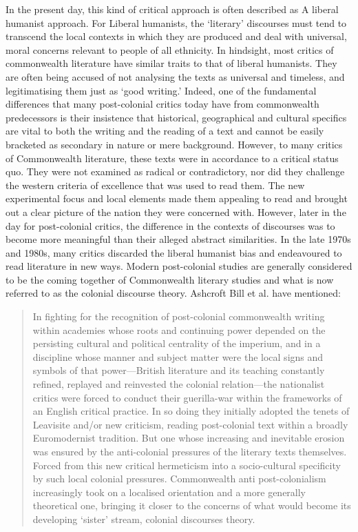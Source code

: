 In the present day, this kind of critical approach is often described as A liberal humanist approach. For Liberal humanists, the ‘literary’ discourses must tend to transcend the local contexts in which they are produced and deal with universal, moral concerns relevant to people of all ethnicity. In hindsight, most critics of commonwealth literature have similar traits to that of liberal humanists. They are often being accused of not analysing the texts as universal and timeless, and legitimatising them just as ‘good writing.’ Indeed, one of the fundamental differences that many post-colonial critics today have from commonwealth predecessors is their insistence that historical, geographical and cultural specifics are vital to both the writing and the reading of a text and cannot be easily bracketed as secondary in nature or mere background. However, to many critics of Commonwealth literature, these texts were in accordance to a critical status quo. They were not examined as radical or contradictory, nor did they challenge the western criteria of excellence that was used to read them. The new experimental focus and local elements made them appealing to read and brought out a clear picture of the nation they were concerned with. However, later in the day for post-colonial critics, the difference in the contexts of discourses was to become more meaningful than their alleged abstract similarities. In the late 1970s and 1980s, many critics discarded the liberal humanist bias and endeavoured to read literature in new ways. Modern post-colonial studies are generally considered to be the coming together of Commonwealth literary studies and what is now referred to as the colonial discourse theory. Ashcroft Bill et al. have mentioned:

\begin{quote}
 In fighting for the recognition of post-colonial commonwealth writing within academies whose roots and continuing power depended on the persisting cultural and political centrality of the imperium, and in a discipline whose manner and subject matter were the local signs and symbols of that power—British literature and its teaching constantly refined, replayed and reinvested the colonial relation—the nationalist critics were forced to conduct their guerilla-war within the frameworks of an English critical practice. In so doing they initially adopted the tenets of Leavisite and/or new criticism, reading post-colonial text within a broadly Euromodernist tradition. But one whose increasing and inevitable erosion was ensured by the \linebreak anti-colonial pressures of the literary texts themselves. Forced from this new critical hermeticism into a socio-cultural specificity by such local colonial pressures. Commonwealth anti post-colonialism increasingly took on a localised orientation and a more generally theoretical one, bringing it closer to the concerns of what would become its developing ‘sister’ stream, colonial discourses theory. \parencite[53--54]{Ashcroft}
\end{quote}

